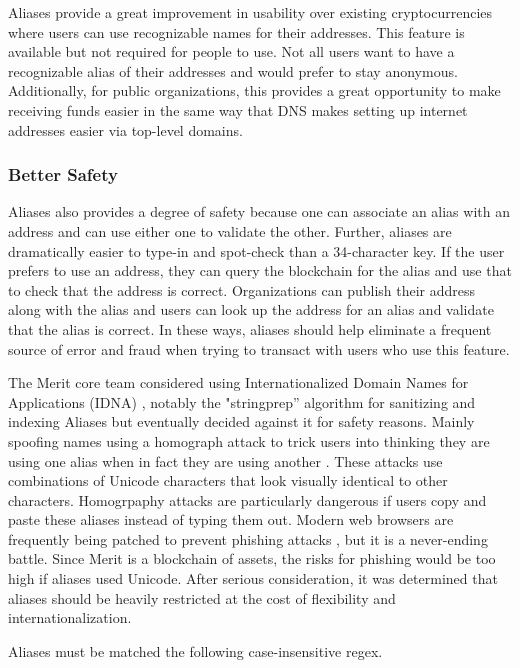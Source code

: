 \documentclass{article}
\begin{document}
Aliases provide a great improvement in usability over existing cryptocurrencies 
where users can use recognizable names for their addresses. This feature is
available but not required for people to use. Not all users want to have a
recognizable alias of their addresses and would prefer to stay anonymous.
Additionally, for public organizations, this provides a great opportunity to make
receiving funds easier in the same way that DNS makes setting up internet addresses easier
via top-level domains.

\subsubsection{Better Safety}

Aliases also provides a degree of safety because one can associate an alias with an address
and can use either one to validate the other. Further, aliases are dramatically easier to 
type-in and spot-check than a 34-character key.  If the user prefers to use an address, they
can query the blockchain for the alias and use that to check that the address
is correct. Organizations can publish their address along with the alias and
users can look up the address for an alias and validate that the alias is correct.
In these ways, aliases should help eliminate a frequent source of error and fraud when trying to transact
with users who use this feature.

The Merit core team considered using Internationalized Domain Names for Applications (IDNA) \cite{IDNA},
notably the "stringprep'' \cite{stringprep} algorithm for sanitizing and
indexing Aliases but eventually decided against it for safety reasons. Mainly
spoofing names using a homograph attack to trick users into thinking they are
using one alias when in fact they are using another \cite{homograph}. These attacks
use combinations of Unicode characters that look visually identical to other characters.
Homogrpaphy attacks are particularly dangerous if users copy and paste these aliases
instead of typing them out. Modern web browsers are frequently being patched to prevent
phishing attacks \cite{phishing}, but it is a never-ending battle. Since Merit
is a blockchain of assets, the risks for phishing
would be too high if aliases used Unicode. After serious consideration, it was determined that aliases 
should be heavily restricted at the cost of flexibility and internationalization.

Aliases must be matched the following case-insensitive \gls{regex}.
\end{document}
